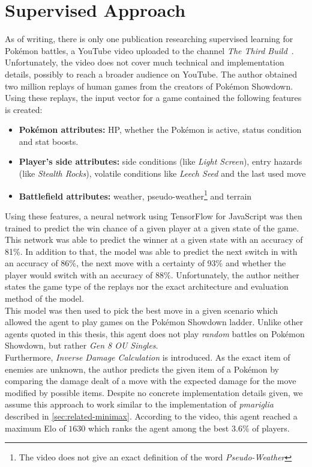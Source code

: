 \section{Supervised Approach}
As of writing, there is only one publication researching supervised learning for Pokémon battles,
a YouTube video uploaded to the channel \grqq\emph{The Third Build}\grqq{}~\cite{TheThirdBuild:PokemonAI}.
Unfortunately, the video does not cover much technical and implementation details, possibly to reach a 
broader audience on YouTube.
The author obtained two million 
replays of human games from the creators of Pokémon Showdown. Using these replays, the input vector for a game
contained the following features is created:
\begin{itemize}
    \item \textbf{Pokémon attributes:} \ac{HP}, whether the Pokémon is active, status condition and stat boosts.
    \item \textbf{Player's side attributes:} side conditions (like \textit{Light Screen}), entry hazards 
    (like \textit{Stealth Rocks}), volatile conditions like \textit{Leech Seed} and the last used move
    \item \textbf{Battlefield attributes:} weather, pseudo-weather\footnote{The video does not give an exact 
    definition of the word \textit{Pseudo-Weather}} and terrain
\end{itemize}
Using these features, a neural network using TensorFlow for JavaScript was then trained to predict the 
win chance of a given player at a given state of the game. This network was able to predict the winner
at a given state with an accuracy of 81\%. In addition to that, the model was able to predict the next
switch in with an accuracy of 86\%, the next move with a certainty of 93\% and whether the
player would switch with an accuracy of 88\%. Unfortunately, the author neither states the game type of
the replays nor the exact architecture and evaluation method of the model. \\
This model was then used to pick the best move in a given scenario which allowed the agent to play games
on the Pokémon Showdown ladder. Unlike other agents quoted in this thesis, this agent does not play
\emph{random} battles on Pokémon Showdown, but rather \emph{Gen 8 OU Singles}. \\
Furthermore, \textit{Inverse Damage Calculation} is introduced. As the exact item of 
enemies are unknown, the author predicts the given item of a Pokémon by comparing the damage dealt
of a move with the expected damage for the move modified by possible items. Despite no concrete 
implementation details given, we assume this approach to work similar to the implementation 
of \emph{pmariglia} described in \ref{sec:related-minimax}.
According to the video, this agent reached a maximum Elo of $1630$ which ranks the agent among the 
best $3.6\%$ of players.